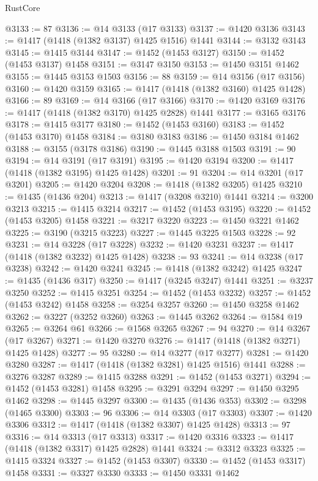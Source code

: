 \begin{lexlean}{RustCore}
\begin{coremodule}
@3133 := 87
@3136 := @14 @3133 (@17 @3133)
@3137 := @1420 @3136
@3143 := @1417 (@1418 (@1382 @3137) @1425 @1516) @1441
@3144 := @3132 @3143
@3145 := @1415 @3144
@3147 := @1452 (@1453 @3127)
@3150 := @1452 (@1453 @3137) @1458
@3151 := @3147 @3150
@3153 := @1450 @3151 @1462
@3155 := @1445 @3153 @1503
@3156 := 88
@3159 := @14 @3156 (@17 @3156)
@3160 := @1420 @3159
@3165 := @1417 (@1418 (@1382 @3160) @1425 @1428)
@3166 := 89
@3169 := @14 @3166 (@17 @3166)
@3170 := @1420 @3169
@3176 := @1417 (@1418 (@1382 @3170) @1425 @2828) @1441
@3177 := @3165 @3176
@3178 := @1415 @3177
@3180 := @1452 (@1453 @3160)
@3183 := @1452 (@1453 @3170) @1458
@3184 := @3180 @3183
@3186 := @1450 @3184 @1462
@3188 := @3155 (@3178 @3186)
@3190 := @1445 @3188 @1503
@3191 := 90
@3194 := @14 @3191 (@17 @3191)
@3195 := @1420 @3194
@3200 := @1417 (@1418 (@1382 @3195) @1425 @1428)
@3201 := 91
@3204 := @14 @3201 (@17 @3201)
@3205 := @1420 @3204
@3208 := @1418 (@1382 @3205) @1425
@3210 := @1435 (@1436 @204)
@3213 := @1417 (@3208 @3210) @1441
@3214 := @3200 @3213
@3215 := @1415 @3214
@3217 := @1452 (@1453 @3195)
@3220 := @1452 (@1453 @3205) @1458
@3221 := @3217 @3220
@3223 := @1450 @3221 @1462
@3225 := @3190 (@3215 @3223)
@3227 := @1445 @3225 @1503
@3228 := 92
@3231 := @14 @3228 (@17 @3228)
@3232 := @1420 @3231
@3237 := @1417 (@1418 (@1382 @3232) @1425 @1428)
@3238 := 93
@3241 := @14 @3238 (@17 @3238)
@3242 := @1420 @3241
@3245 := @1418 (@1382 @3242) @1425
@3247 := @1435 (@1436 @317)
@3250 := @1417 (@3245 @3247) @1441
@3251 := @3237 @3250
@3252 := @1415 @3251
@3254 := @1452 (@1453 @3232)
@3257 := @1452 (@1453 @3242) @1458
@3258 := @3254 @3257
@3260 := @1450 @3258 @1462
@3262 := @3227 (@3252 @3260)
@3263 := @1445 @3262
@3264 := @1584 @19
@3265 := @3264 @61
@3266 := @1568 @3265
@3267 := 94
@3270 := @14 @3267 (@17 @3267)
@3271 := @1420 @3270
@3276 := @1417 (@1418 (@1382 @3271) @1425 @1428)
@3277 := 95
@3280 := @14 @3277 (@17 @3277)
@3281 := @1420 @3280
@3287 := @1417 (@1418 (@1382 @3281) @1425 @1516) @1441
@3288 := @3276 @3287
@3289 := @1415 @3288
@3291 := @1452 (@1453 @3271)
@3294 := @1452 (@1453 @3281) @1458
@3295 := @3291 @3294
@3297 := @1450 @3295 @1462
@3298 := @1445 @3297
@3300 := @1435 (@1436 @353)
@3302 := @3298 (@1465 @3300)
@3303 := 96
@3306 := @14 @3303 (@17 @3303)
@3307 := @1420 @3306
@3312 := @1417 (@1418 (@1382 @3307) @1425 @1428)
@3313 := 97
@3316 := @14 @3313 (@17 @3313)
@3317 := @1420 @3316
@3323 := @1417 (@1418 (@1382 @3317) @1425 @2828) @1441
@3324 := @3312 @3323
@3325 := @1415 @3324
@3327 := @1452 (@1453 @3307)
@3330 := @1452 (@1453 @3317) @1458
@3331 := @3327 @3330
@3333 := @1450 @3331 @1462

\end{coremodule}
\end{lexlean}
